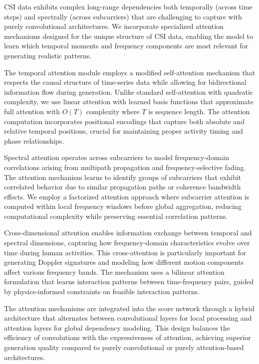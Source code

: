 \documentclass[journal]{IEEEtran}
\begin{document}
CSI data exhibits complex long-range dependencies both temporally (across time steps) and spectrally (across subcarriers) that are challenging to capture with purely convolutional architectures. We incorporate specialized attention mechanisms designed for the unique structure of CSI data, enabling the model to learn which temporal moments and frequency components are most relevant for generating realistic patterns.

The temporal attention module employs a modified self-attention mechanism that respects the causal structure of time-series data while allowing for bidirectional information flow during generation. Unlike standard self-attention with quadratic complexity, we use linear attention with learned basis functions that approximate full attention with $O(T)$ complexity where $T$ is sequence length. The attention computation incorporates positional encodings that capture both absolute and relative temporal positions, crucial for maintaining proper activity timing and phase relationships.

Spectral attention operates across subcarriers to model frequency-domain correlations arising from multipath propagation and frequency-selective fading. The attention mechanism learns to identify groups of subcarriers that exhibit correlated behavior due to similar propagation paths or coherence bandwidth effects. We employ a factorized attention approach where subcarrier attention is computed within local frequency windows before global aggregation, reducing computational complexity while preserving essential correlation patterns.

Cross-dimensional attention enables information exchange between temporal and spectral dimensions, capturing how frequency-domain characteristics evolve over time during human activities. This cross-attention is particularly important for generating Doppler signatures and modeling how different motion components affect various frequency bands. The mechanism uses a bilinear attention formulation that learns interaction patterns between time-frequency pairs, guided by physics-informed constraints on feasible interaction patterns.

The attention mechanisms are integrated into the score network through a hybrid architecture that alternates between convolutional layers for local processing and attention layers for global dependency modeling. This design balances the efficiency of convolutions with the expressiveness of attention, achieving superior generation quality compared to purely convolutional or purely attention-based architectures.
\end{document}
